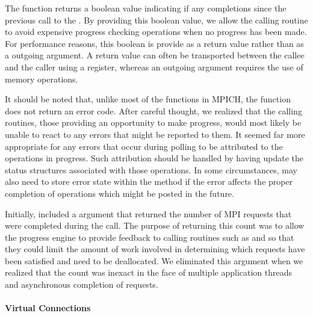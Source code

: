 The  function returns a boolean value indicating if any
completions since the previous call to the .  By providing
this boolean value, we allow the calling routine to avoid expensive progress
checking operations when no progress has been made.  For performance reasons,
this boolean is provide as a return value rather than as a outgoing argument.
A return value can often be transported between the callee and the caller using
a register, whereas an outgoing argument requires the use of memory operations.

It should be noted that, unlike most of the functions in MPICH, the
 function does not return an error code.  After careful
thought, we realized that the calling routines, those providing an opportunity
to make progress, would most likely be unable to react to any errors that might
be reported to them.  It seemed far more appropriate for any errors that occur
during polling to be attributed to the operations in progress.  Such
attribution should be handled by having  update the status
structures associated with those operations.  In some circumstances,
 may also need to store error state within the method if the
error affects the proper completion of operations which might be posted in the
future.

\begin{discussion}
Initially,  included a  argument that returned the
number of MPI requests that were completed during the call.  The purpose of
returning this count was to allow the progress engine to provide feedback to
calling routines such as  and  so that they could
limit the amount of work involved in determining which requests have been
satisfied and need to be deallocated.  We eliminated this argument when we
realized that the count was inexact in the face of multiple application threads
and asynchronous completion of requests.
\end{discussion}


\paragraph{Virtual Connections}

% 
% 

